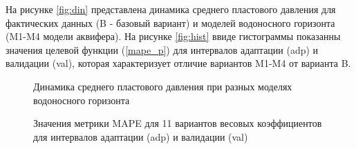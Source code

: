 \documentclass{article}
\begin{document}
На рисунке \ref{fig:din} представлена динамика среднего пластового давления для фактических данных (B - базовый вариант) и моделей водоносного горизонта (M1-M4 модели аквифера). На рисунке \ref{fig:hist} ввиде гистограммы показанны значения целевой функции (\ref{mape_p}) для интервалов адаптации (adp) и валидации (val), которая характеризует отличие вариантов M1-M4 от варианта B.
\begin{figure} 
    \begin{minipage}[h]{0.48\linewidth}
      \caption{Динамика среднего пластового давления при разных моделях водоносного горизонта}
      \label{fig:din}
    \end{minipage} \hfill
    \begin{minipage}[h]{0.48\linewidth}
      \caption{Значения метрики MAPE для 11 вариантов весовых коэффициентов для интервалов адаптации (adp) и валидации (val)}
      \label{fig:wp}
    \end{minipage} 
\end{figure}
\end{document}
